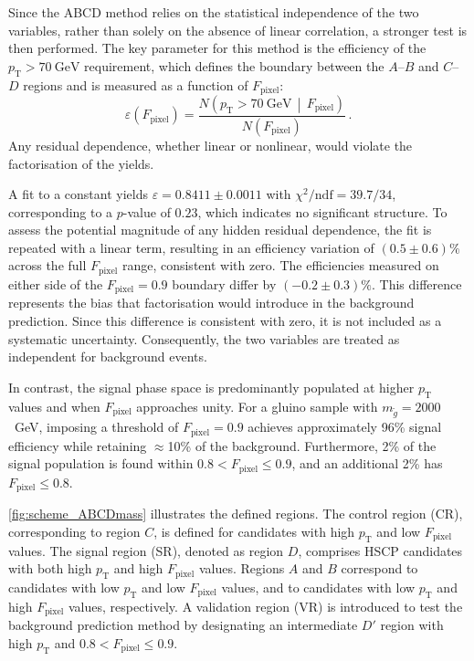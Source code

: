 Since the ABCD method relies on the statistical independence of the two variables, rather than solely on the absence of linear correlation, a stronger test is then performed. The key parameter for this method is the efficiency of the $p_{\mathrm{T}} > 70~\mathrm{GeV}$ requirement, which defines the boundary between the $A$--$B$ and $C$--$D$ regions and is measured as a function of $F_\textrm{pixel}$:
%
\begin{equation}
  \varepsilon(F_\textrm{pixel}) =
  \frac{N\left(p_{\mathrm{T}} > 70~\mathrm{GeV} \,\middle|\, F_\textrm{pixel}\right)}
       {N\left(F_\textrm{pixel}\right)} \, .
  \label{eq:abcd_eff}
\end{equation}
%
Any residual dependence, whether linear or nonlinear, would violate the factorisation of the yields.

A fit to a constant yields $\varepsilon = 0.8411 \pm 0.0011$ with $\chi^2/\mathrm{ndf} = 39.7/34$, corresponding to a $p$-value of $0.23$, which indicates no significant structure. To assess the potential magnitude of any hidden residual dependence, the fit is repeated with a linear term, resulting in an efficiency variation of $(0.5 \pm 0.6)\%$ across the full $F_\textrm{pixel}$ range, consistent with zero. The efficiencies measured on either side of the $F_\textrm{pixel} = 0.9$ boundary differ by $(-0.2 \pm 0.3)\%$. This difference represents the bias that factorisation would introduce in the background prediction. Since this difference is consistent with zero, it is not included as a systematic uncertainty. Consequently, the two variables are treated as independent for background events.

In contrast, the signal phase space is predominantly populated at higher $p_{\mathrm{T}}$ values and when $F_\textrm{pixel}$ approaches unity. For a gluino sample with $m_{\tilde{g}}=2000$~GeV, imposing a threshold of $F_\textrm{pixel} = 0.9$ achieves approximately 96\% signal efficiency while retaining $\approx$10\% of the background. Furthermore, 2\% of the signal population is found within $0.8 < F_\mathrm{pixel} \leq 0.9$, and an additional 2\% has $F_\mathrm{pixel} \leq 0.8$.

\vspace{0.5 cm}

\cref{fig:scheme_ABCDmass} illustrates the defined regions. The control region (CR), corresponding to region $C$, is defined for candidates with high $p_{\mathrm{T}}$ and low $F_\textrm{pixel}$ values. The signal region (SR), denoted as region $D$, comprises HSCP candidates with both high $p_{\mathrm{T}}$ and high $F_\textrm{pixel}$ values. Regions $A$ and $B$ correspond to candidates with low $p_{\mathrm{T}}$ and low $F_\textrm{pixel}$ values, and to candidates with low $p_{\mathrm{T}}$ and high $F_\textrm{pixel}$ values, respectively. A validation region (VR) is introduced to test the background prediction method by designating an intermediate $D'$ region with high $p_{\mathrm{T}}$ and $0.8<F_\textrm{pixel}\leq0.9$.

